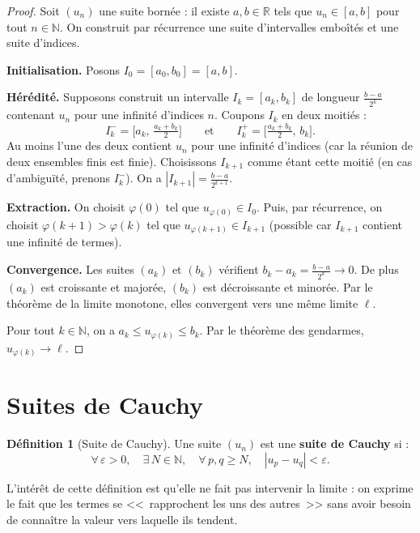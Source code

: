 \documentclass[12pt,a4paper,openany]{book}
\theoremstyle{definition}
\newtheorem{definition}{Définition}[chapter]
\newcommand{\N}{\mathbb{N}}
\newcommand{\R}{\mathbb{R}}
\newcommand{\eps}{\varepsilon}
\newcommand{\abs}[1]{\left\lvert #1 \right\rvert}
\begin{document}
\begin{proof}
  Soit $(u_n)$ une suite bornée : il existe $a, b \in \R$ tels que $u_n \in [a, b]$
  pour tout $n \in \N$. On construit par récurrence une suite d'intervalles emboîtés
  et une suite d'indices.

  \textbf{Initialisation.} Posons $I_0 = [a_0, b_0] = [a, b]$.

  \textbf{Hérédité.} Supposons construit un intervalle $I_k = [a_k, b_k]$ de longueur
  $\frac{b - a}{2^k}$ contenant $u_n$ pour une infinité d'indices $n$. Coupons $I_k$
  en deux moitiés :
  \[
    I_k^- = \bigl[a_k,\, \tfrac{a_k + b_k}{2}\bigr]
    \qquad \text{et} \qquad
    I_k^+ = \bigl[\tfrac{a_k + b_k}{2},\, b_k\bigr].
  \]
  Au moins l'une des deux contient $u_n$ pour une infinité d'indices (car la réunion
  de deux ensembles finis est finie). Choisissons $I_{k+1}$ comme étant cette moitié
  (en cas d'ambiguïté, prenons $I_k^-$). On a $\abs{I_{k+1}} = \frac{b - a}{2^{k+1}}$.

  \textbf{Extraction.} On choisit $\varphi(0)$ tel que $u_{\varphi(0)} \in I_0$. Puis,
  par récurrence, on choisit $\varphi(k+1) > \varphi(k)$ tel que $u_{\varphi(k+1)} \in I_{k+1}$
  (possible car $I_{k+1}$ contient une infinité de termes).

  \textbf{Convergence.} Les suites $(a_k)$ et $(b_k)$ vérifient $b_k - a_k = \frac{b-a}{2^k} \to 0$.
  De plus $(a_k)$ est croissante et majorée, $(b_k)$ est décroissante et minorée. Par le
  théorème de la limite monotone, elles convergent vers une même limite $\ell$.

  Pour tout $k \in \N$, on a $a_k \leq u_{\varphi(k)} \leq b_k$. Par le théorème des
  gendarmes, $u_{\varphi(k)} \to \ell$.
\end{proof}

\section{Suites de Cauchy}\label{sec:suites:cauchy}

\begin{definition}[Suite de Cauchy]\label{def:suite-cauchy}
  Une suite $(u_n)$ est une \textbf{suite de Cauchy} si :
  \[
    \boxed{\forall\, \eps > 0, \quad \exists\, N \in \N, \quad
      \forall\, p, q \geq N, \quad \abs{u_p - u_q} < \eps.}
  \]
\end{definition}

\noindent L'intérêt de cette définition est qu'elle ne fait pas intervenir la limite :
on exprime le fait que les termes se <<~rapprochent les uns des autres~>> sans
avoir besoin de connaître la valeur vers laquelle ils tendent.
\end{document}
